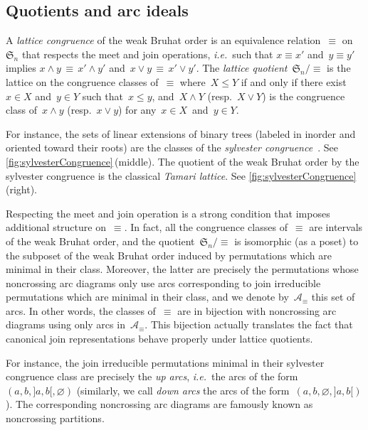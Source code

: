 \documentclass{amsart}
\theoremstyle{definition}
\renewcommand{\c}[1]{\mathcal{#1}} %
\newcommand{\f}[1]{\mathfrak{#1}} %
\newcommand{\ie}{\textit{i.e.}~} %
\newcommand{\darkblue}{\color{darkblue}} %
\newcommand{\defn}[1]{\textsl{\darkblue #1}} %
\newcommand{\meet}{\wedge} %
\newcommand{\join}{\vee} %
\begin{document}

\subsection{Quotients and arc ideals}
\label{subsec:arcIdeals}

A \defn{lattice congruence} of the weak Bruhat order is an equivalence relation~$\equiv$ on~$\f{S}_n$ that respects the meet and join operations, \ie such that $x \equiv x'$ and~$y \equiv y'$ implies $x \meet y \, \equiv \, x' \meet y'$ and~$x \join y \, \equiv \, x' \join y'$.
The \defn{lattice quotient}~$\f{S}_n/{\equiv}$ is the lattice on the congruence classes of~$\equiv$ where~$X \le Y$ if and only if there exist~$x \in X$ and~$y \in Y$ such that~$x \le y$, and~$X \meet Y$ (resp.~$X \join Y$) is the congruence class of~$x \meet y$ (resp.~$x \join y$) for any~$x \in X$~and~$y \in Y$.

For instance, the sets of linear extensions of binary trees (labeled in inorder and oriented toward their roots) are the classes of the \defn{sylvester congruence}~\cite{MR2142078}.
See \cref{fig:sylvesterCongruence}\,(middle).
The quotient of the weak Bruhat order by the sylvester congruence is the classical \defn{Tamari lattice}.
See \cref{fig:sylvesterCongruence}\,(right).

Respecting the meet and join operation is a strong condition that imposes additional structure on~$\equiv$.
In fact, all the congruence classes of~$\equiv$ are intervals of the weak Bruhat order, and the quotient~$\f{S}_n/{\equiv}$ is isomorphic (as a poset) to the subposet of the weak Bruhat order induced by permutations which are minimal in their class.
Moreover, the latter are precisely the permutations whose noncrossing arc diagrams only use arcs corresponding to join irreducible permutations which are minimal in their class, and we denote by~$\c{A}_\equiv$ this set of arcs.
In other words, the classes of~$\equiv$ are in bijection with noncrossing arc diagrams using only arcs in~$\c{A}_\equiv$.
This bijection actually translates the fact that canonical join representations behave properly under lattice quotients.

For instance, the join irreducible permutations minimal in their sylvester congruence class are precisely the \defn{up arcs}, \ie the arcs of the form~$(a, b, {]a,b[}, \varnothing)$ (similarly, we call \defn{down arcs} the arcs of the form~$(a, b, \varnothing, {]a,b[})$
).
The corresponding noncrossing arc diagrams are famously known as noncrossing partitions.
\end{document}
